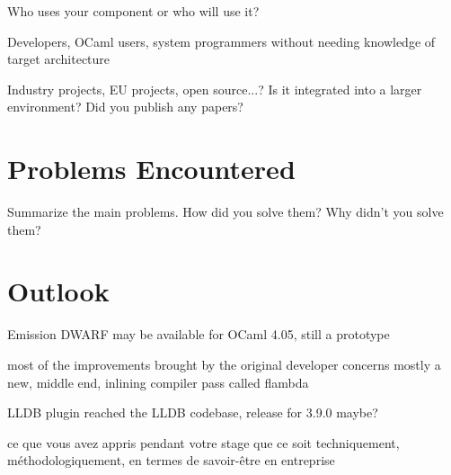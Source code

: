 Who uses your component or who will use it?

Developers, OCaml users, system programmers
without needing knowledge of target architecture

Industry projects, EU projects, open source...? Is it integrated into a larger environment? Did you publish any papers?

\section{Problems Encountered\label{sec:problems}}

Summarize the main problems. How did you solve them? Why didn't you solve them?

\section{Outlook\label{sec:outlook}}
Emission DWARF \autocite{libmond} \autocite{dwpr}
may be available for OCaml 4.05, still a prototype

most of the improvements brought by the original developer concerns mostly a
new, middle end, inlining compiler pass called flambda


LLDB plugin reached the LLDB codebase,
release for 3.9.0 maybe?




ce que vous avez appris pendant votre stage que ce soit techniquement, méthodologiquement,
en termes de savoir-être en entreprise
